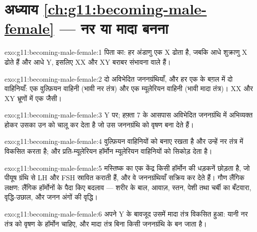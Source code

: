 \section*{अध्याय \ref{ch:g11:becoming-male-female} --- नर या मादा बनना}

\begin{solution}{exo:g11:becoming-male-female:1}
पिता का: हर अंडाणु एक X ढोता है, जबकि आधे शुक्राणु X ढोते हैं और आधे Y,
इसलिए XX और XY बराबर संभावना वाले हैं।
\end{solution}

\begin{solution}{exo:g11:becoming-male-female:2}
दो अविभेदित जननग्रंथियाँ, और हर एक के बग़ल में दो वाहिनियाँ: एक वुल्फ़ियन
वाहिनी (भावी नर तंत्र) और एक म्यूलेरियन वाहिनी (भावी मादा तंत्र)। XX और XY
भ्रूणों में एक जैसी।
\end{solution}

\begin{solution}{exo:g11:becoming-male-female:3}
Y  पर; हफ़्ता 7 के आसपास अविभेदित जननग्रंथि में अभिव्यक्त होकर उसका
 उन  को चालू कर देता है जो उस जननग्रंथि को वृषण बना देते हैं।
\end{solution}

\begin{solution}{exo:g11:becoming-male-female:4}
 वुल्फ़ियन वाहिनियों को बनाए रखता है और उन्हें नर तंत्र में
विकसित करता है; और प्रति-म्यूलेरियन हॉर्मोन म्यूलेरियन वाहिनियों को सिकोड़
देता है।
\end{solution}

\begin{solution}{exo:g11:becoming-male-female:5}
मस्तिष्क का एक केंद्र किसी हॉर्मोन की धड़कनें छोड़ता है, जो पीयूष ग्रंथि से
LH और FSH स्रावित कराती हैं, और वे जननग्रंथियाँ सक्रिय कर देते हैं। गौण
लैंगिक लक्षण: लैंगिक हॉर्मोनों के पैदा किए बदलाव --- शरीर के बाल, आवाज़,
स्तन, पेशी तथा चर्बी का बँटवारा, वृद्धि-उछाल, और जनन अंगों की वृद्धि।
\end{solution}

\begin{solution}{exo:g11:becoming-male-female:6}
अपने Y  के बावजूद उसमें मादा तंत्र विकसित हुआ: यानी नर तंत्र को
वृषण के हॉर्मोन चाहिए, और मादा तंत्र बिना किसी जननग्रंथि के बन जाता है।
\end{solution}

